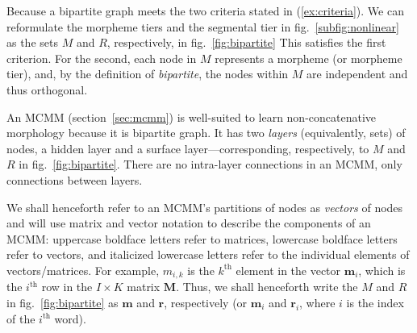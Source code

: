 Because a bipartite graph meets the two criteria stated in
(\ref{ex:criteria}).  We can reformulate the morpheme tiers and the
segmental tier in fig.~\ref{subfig:nonlinear} as the sets $M$ and
$R$, respectively, in fig.~\ref{fig:bipartite} This satisfies the first
criterion. For the second, each node in $M$ represents a morpheme (or
morpheme tier), and, by the definition of \emph{bipartite}, the nodes
within $M$ are independent and thus orthogonal.

An MCMM (section~\ref{sec:mcmm}) is well-suited to learn 
non-concatenative morphology because it is bipartite graph. It has two
\emph{layers} (equivalently, sets) of nodes, a hidden layer and a
surface layer---corresponding, respectively, to $M$ and $R$ in
fig.~\ref{fig:bipartite}. There are no intra-layer connections in an
MCMM, only connections between layers.

We shall henceforth refer to an MCMM's partitions of nodes as
\emph{vectors} of nodes and will use matrix and vector notation to
describe the components of an MCMM:
uppercase boldface letters refer to matrices, %
lowercase boldface letters refer to vectors,
and italicized lowercase letters refer to the individual elements
of vectors/matrices. %
For example, $m_{i,k}$ is the $k^{\text{th}}$ element in the vector
$\mathbf{m}_i$, which is the $i^{\text{th}}$ row in the $I \times K$ matrix
$\mathbf{M}$. Thus, we shall henceforth write the $M$ and $R$ in
fig.~\ref{fig:bipartite} as $\mathbf{m}$ and $\mathbf{r}$,
respectively (or $\mathbf{m}_i$ and $\mathbf{r}_i$, where $i$ is the
index of the $i^{\text{th}}$ word).